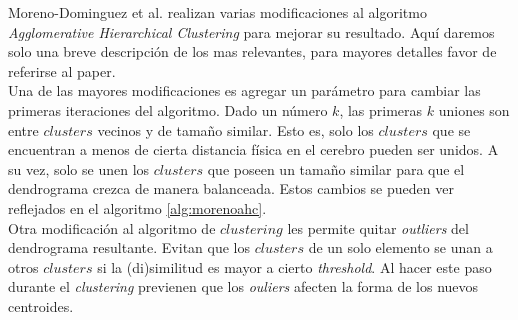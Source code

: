 Moreno-Dominguez et al. realizan varias modificaciones al algoritmo 
\textit{Agglomerative Hierarchical Clustering} para mejorar su resultado.
Aqu\'i daremos solo una breve descripci\'on de los mas relevantes, para
mayores detalles favor de referirse al paper.\\

Una de las mayores modificaciones es agregar un par\'ametro
para cambiar las primeras iteraciones del algoritmo.
Dado un n\'umero $k$, las primeras $k$ uniones son entre $clusters$
vecinos y de tama\~no similar. Esto es, solo los $clusters$ que se
encuentran a menos de cierta distancia f\'isica en el cerebro pueden ser
unidos. A su vez, solo se unen los $clusters$ que poseen un tama\~no
similar
para que el dendrograma crezca de manera balanceada. Estos cambios se
pueden ver reflejados en el algoritmo \ref{alg:morenoahc}. \\

Otra modificaci\'on al algoritmo de $clustering$ les permite quitar
\textit{outliers} del dendrograma resultante. Evitan que los $clusters$ de
un solo elemento se unan a otros $clusters$ si la (di)similitud es mayor a
cierto \textit{threshold}. Al hacer este paso durante el 
\textit{clustering} previenen que los  \textit{ouliers} afecten la forma
de los nuevos centroides.\\


